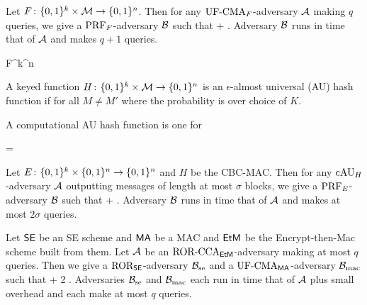 \begin{theorem*}
Let $F{{\kern .05em}\colon{\kern .05em}}\{0,1\}^k\times{\cal M}\rightarrow\{0,1\}^n$. Then for any
$\textnormal{UF-CMA}_F$-adversary ${\mathcal A}$ making $q$ queries, we give a $\textnormal{PRF}_F$-adversary ${\mathcal B}$ such that
\bnm
   \le {} +  \;.
\enm
Adversary ${\mathcal B}$ runs in time that of ${\mathcal A}$ and makes $q+1$ queries.
\end{theorem*}

\bnm
F\Colon\bits^k\times\msgspace\rightarrow\bits^n
\enm




A keyed function $H{{\kern .05em}\colon{\kern .05em}}\{0,1\}^k\times{\cal M}\rightarrow\{0,1\}^n$ is
an $\epsilon$-almost universal (AU) hash function  if for all $M \ne M'$
\bnm
   \le \epsilon
\enm
where the probability is over choice of $K$.

A computational AU hash function is one for 


\bnm
   = 
\enm


\begin{theorem*}
Let $E{{\kern .05em}\colon{\kern .05em}}\{0,1\}^k\times\{0,1\}^n\rightarrow\{0,1\}^n$ and $H$ be the CBC-MAC. 
Then for any $\textnormal{cAU}_H$-adversary ${\mathcal A}$ outputting messages of length at most
$\sigma$ blocks, we give a $\textnormal{PRF}_E$-adversary ${\mathcal B}$
such that
\bnm
   \le {} +  \;.
\enm
Adversary ${\mathcal B}$ runs in time that of ${\mathcal A}$ and makes at most $2\sigma$
queries.
\end{theorem*}


\begin{theorem*}
Let ${\mathsf{SE}}$ be an SE scheme and $\mathsf{MA}$ be a MAC and $\mathsf{EtM}$ be the Encrypt-then-Mac
scheme built from them.  Let ${\mathcal A}$ be an $\textnormal{ROR-CCA}_{\mathsf{EtM}}$-adversary making at most
$q$ queries. Then we give a $\textnormal{ROR}_{\mathsf{SE}}$-adversary ${\mathcal B}_{\textrm{se}}$ 
and a $\textnormal{UF-CMA}_{\mathsf{MA}}$-adversary  ${\mathcal B}_\textrm{mac}$ 
such that
\bnm
  \AdvRORCCA{\EtM}{\advA} \le {} + 2\cdotsm{} \;.
\enm
Adversaries ${\mathcal B}_\textrm{se}$ and ${\mathcal B}_{\textrm{mac}}$ each run in time that of 
${\mathcal A}$ plus small overhead and each make at most $q$ queries.
\end{theorem*}
